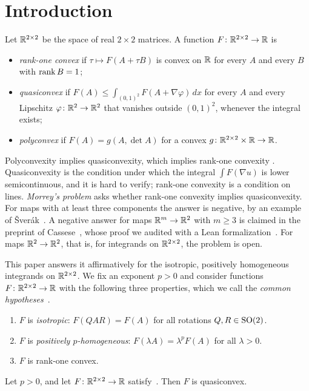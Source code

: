 \section{Introduction}\label{sec:intro}

Let $\mathbb{R}^{2\times 2}$ be the space of real $2\times2$ matrices. A function $F\colon\mathbb{R}^{2\times 2}\to\mathbb{R}$ is
\begin{itemize}
\item \emph{rank-one convex} if $\tau\mapsto F(A+\tau B)$ is convex on $\mathbb{R}$ for every $A$ and
  every $B$ with $\operatorname{rank} B=1$;
\item \emph{quasiconvex} if $F(A)\le\int_{(0,1)^2}F(A+\nabla\varphi)\,dx$ for every $A$ and every
  Lipschitz $\varphi\colon\mathbb{R}^2\to\mathbb{R}^2$ that vanishes outside $(0,1)^2$, whenever the integral
  exists;
\item \emph{polyconvex} if $F(A)=g(A,\det A)$ for a convex $g\colon\mathbb{R}^{2\times 2}\times\mathbb{R}\to\mathbb{R}$.
\end{itemize}
Polyconvexity implies quasiconvexity, which implies rank-one convexity
\cite{Morrey1952,Ball1977,Dacorogna2008}. Quasiconvexity is the condition under which the
integral $\int F(\nabla u)$ is lower semicontinuous, and it is hard to verify; rank-one convexity
is a condition on lines. \emph{Morrey's problem} asks whether rank-one convexity implies
quasiconvexity. For maps with at least three components the answer is negative, by an example of
\v{S}ver\'ak~\cite{Sverak1992}. A negative answer for maps $\mathbb{R}^m\to\mathbb{R}^2$ with $m\ge3$ is
claimed in the preprint of Cassese~\cite{Cassese2026}, whose proof we audited with a Lean
formalization~\cite{Companion}. For maps $\mathbb{R}^2\to\mathbb{R}^2$, that is, for integrands on $\mathbb{R}^{2\times 2}$, the
problem is open.

This paper answers it affirmatively for the isotropic, positively homogeneous integrands on
$\mathbb{R}^{2\times 2}$. We fix an exponent $p>0$ and consider functions $F\colon\mathbb{R}^{2\times 2}\to\mathbb{R}$ with the following three
properties, which we call the \emph{common hypotheses}~\Hyp.
\begin{enumerate}[label=\textup{(H\arabic*)}]
\item\label{H1} $F$ is \emph{isotropic}: $F(QAR)=F(A)$ for all rotations $Q,R\in\mathrm{SO}(2)$.
\item\label{H2} $F$ is \emph{positively $p$-homogeneous}: $F(\lambda A)=\lambda^pF(A)$ for all
  $\lambda>0$.
\item\label{H3} $F$ is rank-one convex.
\end{enumerate}

\begin{maintheorem}\label{thm:A}
Let $p>0$, and let $F\colon\mathbb{R}^{2\times 2}\to\mathbb{R}$ satisfy~\Hyp. Then $F$ is quasiconvex.
\end{maintheorem}

